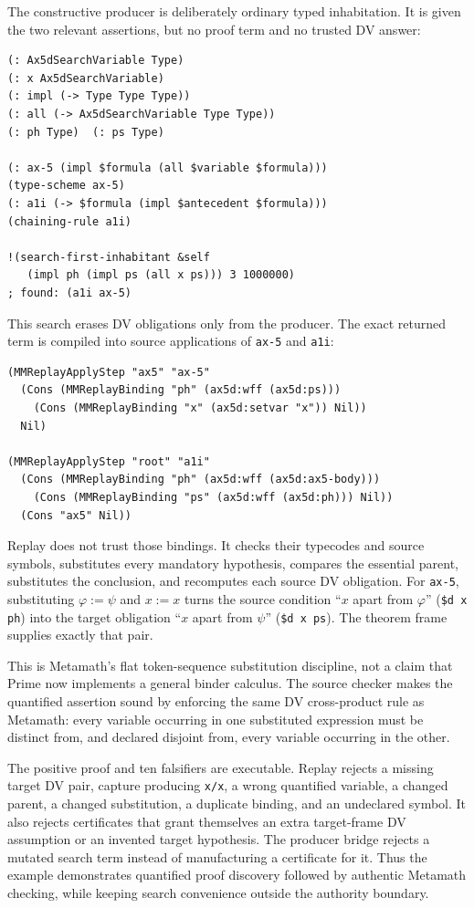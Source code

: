 \documentclass[10pt]{article}
\begin{document}
The constructive producer is deliberately ordinary typed inhabitation.  It is
given the two relevant assertions, but no proof term and no trusted DV answer:

\begin{lstlisting}
(: Ax5dSearchVariable Type)
(: x Ax5dSearchVariable)
(: impl (-> Type Type Type))
(: all (-> Ax5dSearchVariable Type Type))
(: ph Type)  (: ps Type)

(: ax-5 (impl $formula (all $variable $formula)))
(type-scheme ax-5)
(: a1i (-> $formula (impl $antecedent $formula)))
(chaining-rule a1i)

!(search-first-inhabitant &self
   (impl ph (impl ps (all x ps))) 3 1000000)
; found: (a1i ax-5)
\end{lstlisting}

This search erases DV obligations only from the producer.  The exact returned
term is compiled into source applications of \texttt{ax-5} and \texttt{a1i}:

\begin{lstlisting}
(MMReplayApplyStep "ax5" "ax-5"
  (Cons (MMReplayBinding "ph" (ax5d:wff (ax5d:ps)))
    (Cons (MMReplayBinding "x" (ax5d:setvar "x")) Nil))
  Nil)

(MMReplayApplyStep "root" "a1i"
  (Cons (MMReplayBinding "ph" (ax5d:wff (ax5d:ax5-body)))
    (Cons (MMReplayBinding "ps" (ax5d:wff (ax5d:ph))) Nil))
  (Cons "ax5" Nil))
\end{lstlisting}

Replay does not trust those bindings.  It checks their typecodes and source
symbols, substitutes every mandatory hypothesis, compares the essential
parent, substitutes the conclusion, and recomputes each source DV obligation.
For \texttt{ax-5}, substituting $\varphi:=\psi$ and $x:=x$ turns the source
condition ``$x$ apart from $\varphi$'' (\texttt{\$d x ph}) into the target
obligation ``$x$ apart from $\psi$'' (\texttt{\$d x ps}).  The theorem frame
supplies exactly that pair.

This is Metamath's flat token-sequence substitution discipline, not a claim
that Prime now implements a general binder calculus.  The source checker makes
the quantified assertion sound by enforcing the same DV cross-product rule as
Metamath: every variable occurring in one substituted expression must be
distinct from, and declared disjoint from, every variable occurring in the
other.

The positive proof and ten falsifiers are executable.  Replay rejects a
missing target DV pair, capture producing \texttt{x/x}, a wrong quantified
variable, a changed parent, a changed substitution, a duplicate binding, and
an undeclared symbol.  It also rejects certificates that grant themselves an
extra target-frame DV assumption or an invented target hypothesis.  The producer bridge rejects a mutated
search term instead of manufacturing a certificate for it.  Thus the example demonstrates
quantified proof discovery followed by authentic Metamath checking, while
keeping search convenience outside the authority boundary.
\end{document}
